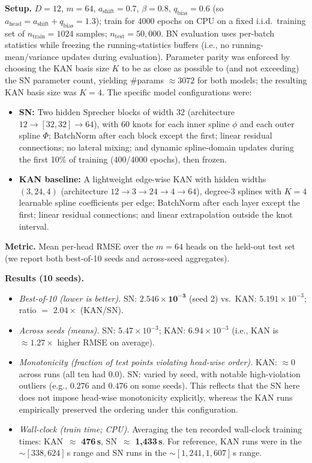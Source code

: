 \documentclass{article}
\theoremstyle{plain}
\theoremstyle{definition}
\theoremstyle{remark}
\begin{document}
\textbf{Setup.} $D{=}12$, $m{=}64$, $a_{\mathrm{shift}}{=}0.7$, $\beta{=}0.8$, $q_{\mathrm{bias}}{=}0.6$ (so $a_{\mathrm{head}}{=}a_{\mathrm{shift}}+q_{\mathrm{bias}}{=}1.3$); train for 4000 epochs on CPU on a fixed i.i.d.\ training set of $n_{\mathrm{train}}{=}1024$ samples; $n_{\mathrm{test}}{=}50{,}000$. BN evaluation uses per-batch statistics while freezing the running-statistics buffers (i.e., no running-mean/variance updates during evaluation). Parameter parity was enforced by choosing the KAN basis size $K$ to be as close as possible to (and not exceeding) the SN parameter count, yielding \#params $\approx 3072$ for both models; the resulting KAN basis size was $K{=}4$. The specific model configurations were:
\begin{itemize}
\item \textbf{SN:} Two hidden Sprecher blocks of width $32$ (architecture $12\to[32,32]\to64$), with $60$ knots for each inner spline $\phi$ and each outer spline $\Phi$; BatchNorm after each block except the first; linear residual connections; no lateral mixing; and dynamic spline-domain updates during the first 10\% of training (400/4000 epochs), then frozen.
\item \textbf{KAN baseline:} A lightweight edge-wise KAN with hidden widths $(3,24,4)$ (architecture $12\to3\to24\to4\to64$), degree-$3$ splines with $K{=}4$ learnable spline coefficients per edge; BatchNorm after each layer except the first; linear residual connections; and linear extrapolation outside the knot interval.
\end{itemize}

\textbf{Metric.} Mean per-head RMSE over the $m{=}64$ heads on the held-out test set (we report both best-of-10 seeds and across-seed aggregates).

\textbf{Results (10 seeds).}
\begin{itemize}
\item \emph{Best-of-10 (lower is better).} SN: $\mathbf{2.546\times 10^{-3}}$ (seed 2) vs.\ KAN: $5.191\times 10^{-3}$; ratio $=$ \textbf{$2.04\times$} (KAN/SN).
\item \emph{Across seeds (means).} SN: $5.47\times 10^{-3}$; KAN: $6.94\times 10^{-3}$ (i.e., KAN is $\approx1.27\times$ higher RMSE on average).
\item \emph{Monotonicity (fraction of test points violating head-wise order).} KAN: $\approx0$ across runs (all ten had $0.0$). SN: varied by seed, with notable high-violation outliers (e.g., $0.276$ and $0.476$ on some seeds). This reflects that the SN here does not impose head-wise monotonicity explicitly, whereas the KAN runs empirically preserved the ordering under this configuration.
\item \emph{Wall-clock (train time; CPU).} Averaging the ten recorded wall-clock training times: KAN $\,\approx$ \textbf{476\,s}, SN $\,\approx$ \textbf{1{,}433\,s}. For reference, KAN runs were in the $\sim[338,624]$\,s range and SN runs in the $\sim[1{,}241,1{,}607]$\,s range.
\end{itemize}
\end{document}
